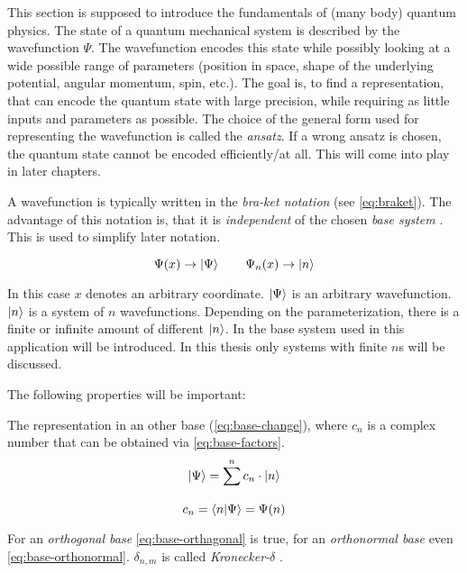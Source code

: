 This section is supposed to introduce the fundamentals of (many body) quantum physics.
The state of a quantum mechanical system is described by the wavefunction $\Psi$. 
The wavefunction encodes this state while possibly looking at a wide possible range of parameters (position in space, shape of the underlying potential, angular momentum, spin, etc.).
The goal is, to find a representation, that can encode the quantum state with large precision, while requiring as little inputs and parameters as possible. The choice of the general form used for representing the wavefunction is called the \emph{ansatz}. 
If a wrong ansatz is chosen, the quantum state cannot be encoded efficiently/at all. This will come into play in later chapters.

A wavefunction is typically written in the \emph{bra-ket notation} (see \autoref{eq:braket}). The advantage of this notation is, that it is \emph{independent} of the chosen \emph{base system} \cite[]{schwablQM}. This is used to simplify later notation.  

\begin{equation}
    \label{eq:braket}
    \Psi(x) \rightarrow \ket{\Psi} \qquad \Psi_n(x) \rightarrow \ket{n}
\end{equation}

In this case $x$ denotes an arbitrary coordinate. $\ket{\Psi}$ is an arbitrary wavefunction. $\ket{n}$ is a system of $n$ wavefunctions. Depending on the parameterization, there is a finite or infinite amount of different $\ket{n}$. In  the base system used in this application will be introduced. In this thesis only systems with finite $n$s will be discussed.

The following properties will be important:

The representation in an other base (\autoref{eq:base-change}), where $c_n$ is a complex number that can be obtained via \autoref{eq:base-factors}.
\begin{equation}
    \label{eq:base-change}
    \ket{\Psi} = \sum\limits_{}^{n} c_n \cdot \ket{n}
\end{equation}
\begin{equation}
    \label{eq:base-factors}
    c_n = \bra{n}\ket{\Psi} = \Psi(n)
\end{equation}

For an \emph{orthogonal base} \autoref{eq:base-orthagonal} is true, for an \emph{orthonormal base} even \autoref{eq:base-orthonormal}. $\delta_{n, m}$ is called \emph{Kronecker-$\delta$} \cite{schwablQM}.

